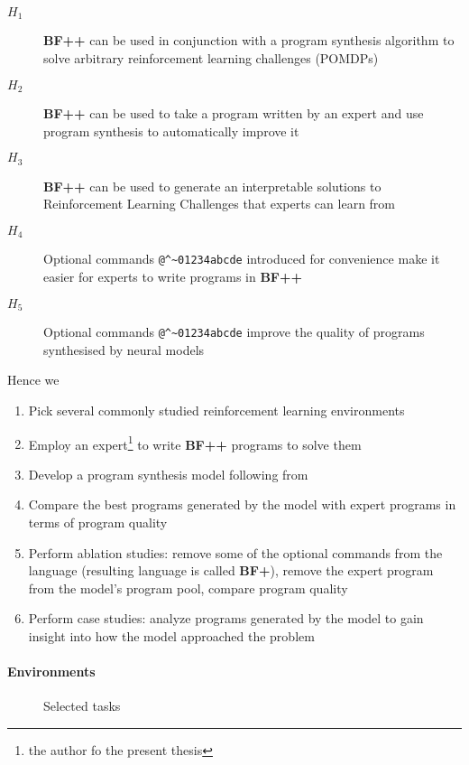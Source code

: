 \begin{description}
    \item[$H_1$] \textbf{BF++} can be used in conjunction with a program synthesis algorithm to solve arbitrary reinforcement learning challenges (POMDPs)
    \item[$H_2$] \textbf{BF++} can be used to take a program written by an expert and use program synthesis to automatically improve it
    \item[$H_3$] \textbf{BF++} can be used to generate an interpretable solutions to Reinforcement Learning Challenges that experts can learn from
    \item[$H_4$] Optional commands \verb|@^~01234abcde| introduced for convenience make it easier for experts to write programs in \textbf{BF++}
    \item[$H_5$] Optional commands \verb|@^~01234abcde| improve the quality of programs synthesised by neural models
\end{description}

Hence we

\begin{enumerate}
    \item Pick several commonly studied reinforcement learning environments
    \item Employ an expert\footnote{the author fo the present thesis} to write \textbf{BF++} programs to solve them
    \item Develop a program synthesis model following from \cite{brain-coder}
    \item Compare the best programs generated by the model with expert programs in terms of program quality
    \item Perform ablation studies: remove some of the optional commands from the language (resulting language is called \textbf{BF+}), remove the expert program from the model's program pool, compare program quality
    \item Perform case studies: analyze programs generated by the model to gain insight into how the model approached the problem
\end{enumerate}

\paragraph{Environments}
\label{sec:envs}

\begin{figure}[t]
    \centering
    \caption{Selected tasks}
    \label{fig:envs}
\end{figure}

